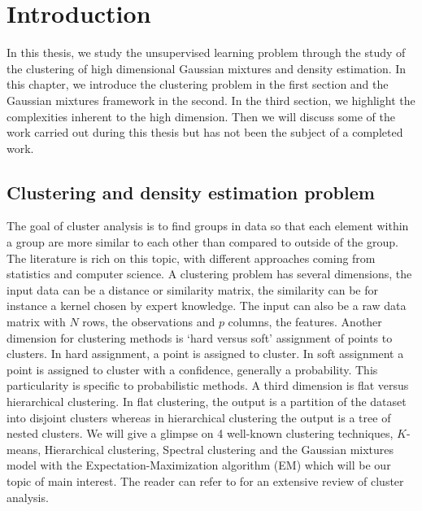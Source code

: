 
\chapter{Introduction\label{chap:intro}}
\minitoc
In this thesis, we study the unsupervised learning problem through the study of the clustering of high dimensional Gaussian mixtures and density estimation. In this chapter, we introduce the clustering problem in the first section and the Gaussian mixtures framework in the second. In the third section, we highlight the complexities inherent to the high dimension. Then we will discuss some of the work carried out during this thesis but has not been the subject of a completed work.
\section{Clustering and density estimation problem}
The goal of cluster analysis is to find groups in data so that each element within a group are more similar to each other than compared to outside of the group. The literature is rich on this topic, with different approaches coming from statistics and computer science. A clustering problem has several dimensions, the input data can be a distance or similarity matrix, the similarity can be for instance a kernel chosen by expert knowledge. The input can also be a raw data matrix with $N$ rows, the observations and $p$ columns, the features. Another dimension for clustering methods is `hard versus soft' assignment of points to clusters. In hard assignment, a point is assigned to cluster. In soft assignment a point is assigned to cluster with a confidence, generally a probability. This particularity is specific to probabilistic methods. A third dimension is flat versus hierarchical clustering. In flat clustering, the output is a partition of the dataset into disjoint clusters whereas in hierarchical clustering the output is a tree of nested clusters. We will give a glimpse on 4 well-known clustering techniques, $K$-means, Hierarchical clustering, Spectral clustering and the Gaussian mixtures model with the Expectation-Maximization algorithm (EM) which will be our topic of main interest. The reader can refer to \citep{hennig2015handbook} for an extensive review of cluster analysis.
